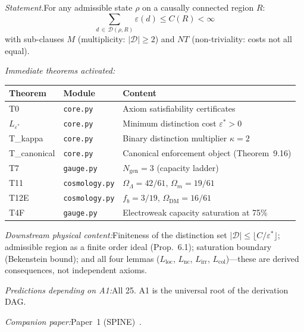 \documentclass[11pt]{article}
\newcommand{\OmL}{\Omega_\Lambda}
\newcommand{\Omm}{\Omega_m}
\newcommand{\OmDM}{\Omega_{\mathrm{DM}}}
\newcommand{\fb}{f_b}
\newcommand{\Ngen}{N_{\mathrm{gen}}}
\newcommand{\eps}{\varepsilon}
\newcommand{\Lnc}{L_{\mathrm{nc}}}
\newcommand{\Lloc}{L_{\mathrm{loc}}}
\newcommand{\Lirr}{L_{\mathrm{irr}}}
\newcommand{\Lcol}{L_{\mathrm{col}}}
\newcommand{\Leps}{L_{\eps^*}}
\begin{document}
\begin{tcolorbox}[apfbox, title={A1 $\longrightarrow$ Global Structure}]
\textit{Statement.}\quad For any admissible state $\rho$ on a causally connected region $R$:
\begin{equation}
\sum_{d\,\in\,\mathcal{D}(\rho,R)} \varepsilon(d) \le C(R) < \infty
\end{equation}
with sub-clauses $M$ (multiplicity: $|\mathcal{D}| \ge 2$) and $NT$ (non-triviality: costs not all equal).

\smallskip\noindent\textit{Immediate theorems activated:}
\begin{center}
\small
\renewcommand{\arraystretch}{1.15}
\begin{tabular}{lll}
\toprule
\textbf{Theorem} & \textbf{Module} & \textbf{Content} \\
\midrule
T0 & \texttt{core.py} & Axiom satisfiability certificates \\
$\Leps$ & \texttt{core.py} & Minimum distinction cost $\eps^* > 0$ \\
T\_kappa & \texttt{core.py} & Binary distinction multiplier $\kappa = 2$ \\
T\_canonical & \texttt{core.py} & Canonical enforcement object (Theorem~9.16) \\
T7 & \texttt{gauge.py} & $\Ngen = 3$ (capacity ladder) \\
T11 & \texttt{cosmology.py} & $\OmL = 42/61$, $\Omm = 19/61$ \\
T12E & \texttt{cosmology.py} & $\fb = 3/19$, $\OmDM = 16/61$ \\
T4F & \texttt{gauge.py} & Electroweak capacity saturation at 75\% \\
\bottomrule
\end{tabular}
\end{center}

\smallskip\noindent\textit{Downstream physical content:}\quad Finiteness of the distinction set $|\mathcal{D}| \le \lfloor C/\eps^*\rfloor$; admissible region as a finite order ideal (Prop.~6.1); saturation boundary (Bekenstein bound); and all four lemmas ($\Lloc$, $\Lnc$, $\Lirr$, $\Lcol$)---these are derived consequences, not independent axioms.

\smallskip\noindent\textit{Predictions depending on A1:}\quad All 25.  A1 is the universal root of the derivation DAG.

\smallskip\noindent\textit{Companion paper:}\quad Paper~1 (SPINE)~\cite{P1}.
\end{tcolorbox}
\end{document}
